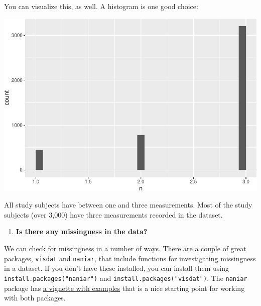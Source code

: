 \documentclass[
]{book}
\newenvironment{Shaded}{\begin{snugshade}}{\end{snugshade}}
\newcommand{\CommentTok}[1]{\textcolor[rgb]{0.56,0.35,0.01}{\textit{#1}}}
\newcommand{\DataTypeTok}[1]{\textcolor[rgb]{0.13,0.29,0.53}{#1}}
\newcommand{\KeywordTok}[1]{\textcolor[rgb]{0.13,0.29,0.53}{\textbf{#1}}}
\newcommand{\NormalTok}[1]{#1}
\newcommand{\OperatorTok}[1]{\textcolor[rgb]{0.81,0.36,0.00}{\textbf{#1}}}
\newcommand{\StringTok}[1]{\textcolor[rgb]{0.31,0.60,0.02}{#1}}
\providecommand{\tightlist}{%
  \setlength{\itemsep}{0pt}\setlength{\parskip}{0pt}}
\begin{document}
You can visualize this, as well. A histogram is one good choice:

\begin{Shaded}
\end{Shaded}

\includegraphics{adv_epi_analysis_files/figure-latex/unnamed-chunk-172-1.pdf}

All study subjects have between one and three measurements. Most of the study
subjects (over 3,000) have three measurements recorded in the dataset.

\begin{enumerate}
\def\labelenumi{\arabic{enumi}.}
\setcounter{enumi}{1}
\tightlist
\item
  \textbf{Is there any missingness in the data?}
\end{enumerate}

We can check for missingness in a number of ways. There are a couple of great
packages, \texttt{visdat} and \texttt{naniar}, that include functions for investigating
missingness in a dataset. If you don't have these installed, you can install
them using \texttt{install.packages("naniar")} and \texttt{install.packages("visdat")}. The
\texttt{naniar} package has \href{https://cran.r-project.org/web/packages/naniar/vignettes/getting-started-w-naniar.html}{a vignette with
examples}
that is a nice starting point for working with both packages.
\end{document}
